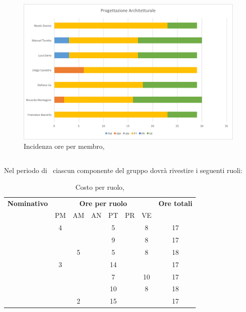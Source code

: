 \begin{figure}[H]
	\centering 
	\includegraphics[scale=0.7]{Immagini/GraficiPianoLavoro/PA.png}
	\caption{Incidenza ore per membro, \PA}
\end{figure}

\newpage
\subsection{\PD}
Nel periodo di \PD\ ciascun componente del gruppo dovrà rivestire i seguenti ruoli:

\begin{table}[h]
	\begin{center}
		\begin{tabular}{|c|c|c|c|c|c|c|c|}
			\hline
			\textbf{Nominativo} & \multicolumn{6}{c|}{\textbf{Ore per ruolo}} & \textbf{Ore totali} \\
					& PM & AM & AN & PT & PR & VE & \\
			\hline
			\FB		& 4  &	  &	   & 5	&	 & 8  &	17	\\
			\hline
			\RM		&	 &	  &	   & 9	&	 & 8 & 17	\\
			\hline
			\SL		&	 & 5  &	   & 5	&	 & 8  &	18	\\
			\hline
			\DC		& 3	 &	  &	   & 14	&	 & 	  &	17	\\
			\hline
			\LD 	&	 &	  &	   & 7	&	 & 10  &	17	\\
			\hline
			\MT		& 	 & 	  &	   & 10	&	 & 8  &	18	\\
			\hline
			\ND 	&	 & 2  &	   & 15	&	 &	  & 17	\\
			\hline
		\end{tabular}
	\end{center}
	\caption{Costo per ruolo, \PD}
\end{table}

